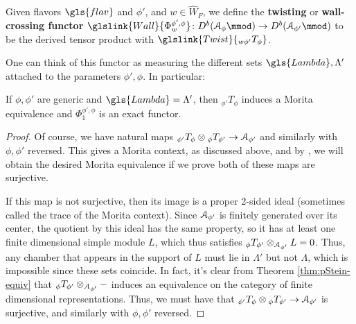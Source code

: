 \begin{definition}
Given flavors $\gls{flav}$ and $\phi'$, and $w\in \widehat{W}_F$, we define the {\bf twisting} or {\bf wall-crossing functor} $\glslink{Wall}{\Phi_w^{\phi',\phi}}\colon D^b(\EuScript{A}_{\phi}\mmod) \to D^b(\EuScript{A}_{\phi'}\mmod)$ to be the derived tensor product with $\glslink{Twist}{{}_{w\phi'}T_{\phi}}$.
\end{definition}
One can think of this functor as measuring the different sets $\gls{Lambda},\Lambda'$ attached to the parameters $\phi',\phi$.  In particular:
\begin{lemma}\label{lem:Lam-same}
  If $\phi, \phi'$ are generic and $\gls{Lambda}=\Lambda'$, then ${}_{\phi'}T_{\phi}$ induces a Morita equivalence and $\Phi_1^{\phi',\phi}$ is an exact functor.
\end{lemma}
\begin{proof}
  Of course, we have natural maps ${}_{\phi'}T_{\phi}\otimes {}_{\phi}T_{\phi'}\to \EuScript{A}_{\phi'}$ and similarly with $\phi,\phi'$ reversed.  This gives a Morita context, as discussed above, and by \cite[II.3.4]{BassK}, we will obtain the desired Morita equivalence if we prove both of these maps are surjective.

  If this map is not surjective, then its image is a proper 2-sided ideal (sometimes called the trace of the Morita context).  Since $  \EuScript{A}_{\phi'}$ is finitely generated over its center, the quotient by this ideal has the same property, so it has at least one finite dimensional simple module $L$, which thus satisfies $ {}_{\phi}T_{\phi'}\otimes_{\EuScript{A}_{\phi'}}L=0$.  Thus, any chamber that appears in the support of $L$ must lie in $\Lambda'$ but not $\Lambda$, which is impossible since these sets coincide.  In fact, it's clear from Theorem \ref{thm:pStein-equiv} that $ {}_{\phi}T_{\phi'}\otimes_{\EuScript{A}_{\phi'}}-$ induces an equivalence on the category of finite dimensional representations.  Thus, we must have that ${}_{\phi'}T_{\phi}\otimes {}_{\phi}T_{\phi'}\to \EuScript{A}_{\phi'}$ is surjective, and similarly with $\phi, \phi'$ reversed.
\end{proof}

